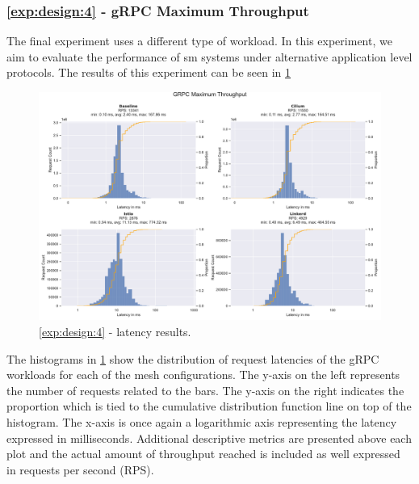 \subsubsection{\ref{exp:design:4} - gRPC Maximum Throughput}
\label{sec:experiments:results:per-experiment:04}

The final experiment uses a different type of workload. In this experiment, we aim to evaluate the performance of \gls{sm} systems under alternative application level protocols. The results of this experiment can be seen in \cref{fig:exp:result:04:latency}


\begin{figure}[h]
    \centering
    
    \includegraphics[width=\linewidth]{5_experimental_evaluation/figures/exp_04-latency-results.pdf}

    \caption{\ref{exp:design:4} - latency results.}
    
    \label{fig:exp:result:04:latency}
\end{figure}

The histograms in \cref{fig:exp:result:04:latency} show the distribution of request latencies of the gRPC workloads for each of the mesh configurations. The y-axis on the left represents the number of requests related to the bars. The y-axis on the right indicates the proportion which is tied to the cumulative distribution function line on top of the histogram. The x-axis is once again a logarithmic axis representing the latency expressed in milliseconds. Additional descriptive metrics are presented above each plot and the actual amount of throughput reached is included as well expressed in requests per second (RPS).

